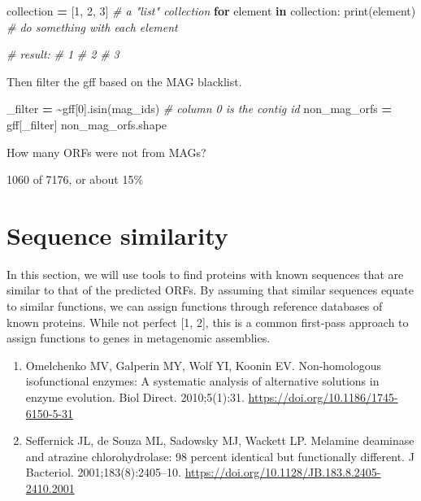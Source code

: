 \documentclass[
]{book}
\newenvironment{Shaded}{\begin{snugshade}}{\end{snugshade}}
\newcommand{\BuiltInTok}[1]{#1}
\newcommand{\CommentTok}[1]{\textcolor[rgb]{0.56,0.35,0.01}{\textit{#1}}}
\newcommand{\ControlFlowTok}[1]{\textcolor[rgb]{0.13,0.29,0.53}{\textbf{#1}}}
\newcommand{\DecValTok}[1]{\textcolor[rgb]{0.00,0.00,0.81}{#1}}
\newcommand{\KeywordTok}[1]{\textcolor[rgb]{0.13,0.29,0.53}{\textbf{#1}}}
\newcommand{\NormalTok}[1]{#1}
\newcommand{\OperatorTok}[1]{\textcolor[rgb]{0.81,0.36,0.00}{\textbf{#1}}}
\providecommand{\tightlist}{%
  \setlength{\itemsep}{0pt}\setlength{\parskip}{0pt}}
\begin{document}
\begin{Shaded}
\begin{Highlighting}[numbers=left,,]
\NormalTok{collection }\OperatorTok{=}\NormalTok{ [}\DecValTok{1}\NormalTok{, }\DecValTok{2}\NormalTok{, }\DecValTok{3}\NormalTok{] }\CommentTok{\# a "list" collection}
\ControlFlowTok{for}\NormalTok{ element }\KeywordTok{in}\NormalTok{ collection:}
    \BuiltInTok{print}\NormalTok{(element) }\CommentTok{\# do something with each element}

\CommentTok{\# result:}
\CommentTok{\# 1}
\CommentTok{\# 2}
\CommentTok{\# 3}
\end{Highlighting}
\end{Shaded}

Then filter the gff based on the MAG blacklist.

\begin{Shaded}
\begin{Highlighting}[numbers=left,,]
\NormalTok{\_filter }\OperatorTok{=} \OperatorTok{\textasciitilde{}}\NormalTok{gff[}\DecValTok{0}\NormalTok{].isin(mag\_ids) }\CommentTok{\# column 0 is the contig id}
\NormalTok{non\_mag\_orfs }\OperatorTok{=}\NormalTok{ gff[\_filter]}
\NormalTok{non\_mag\_orfs.shape}
\end{Highlighting}
\end{Shaded}

How many ORFs were not from MAGs?

1060 of 7176, or about 15\%

\section{Sequence similarity}\label{sequence-similarity}

In this section, we will use tools to find proteins with known sequences that are similar to that of the predicted ORFs.
By assuming that similar sequences equate to similar functions, we can assign functions through reference databases of known proteins.
While not perfect {[}1, 2{]}, this is a common first-pass approach to assign functions to genes in metagenomic assemblies.

\begin{enumerate}
\def\labelenumi{\arabic{enumi}.}
\tightlist
\item
  Omelchenko MV, Galperin MY, Wolf YI, Koonin EV. Non-homologous isofunctional enzymes: A systematic analysis of alternative solutions in enzyme evolution. Biol Direct. 2010;5(1):31. \url{https://doi.org/10.1186/1745-6150-5-31}
\item
  Seffernick JL, de Souza ML, Sadowsky MJ, Wackett LP. Melamine deaminase and atrazine chlorohydrolase: 98 percent identical but functionally different. J Bacteriol. 2001;183(8):2405--10. \url{https://doi.org/10.1128/JB.183.8.2405-2410.2001}
\end{enumerate}
\end{document}
